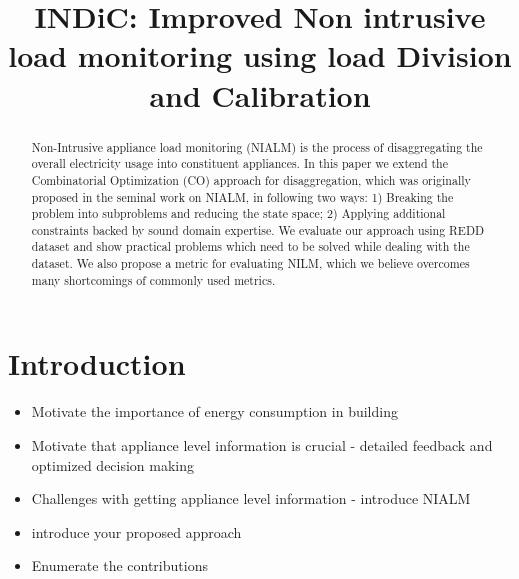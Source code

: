 \documentclass[conference]{IEEEtran}
\begin{document}
%
\title{INDiC: Improved Non intrusive load monitoring using load Division and Calibration}


\author{
\and
{}
\and
{}
}
\maketitle


\begin{abstract}
Non-Intrusive appliance load monitoring (NIALM) is the process of disaggregating the overall electricity usage into constituent appliances. In this paper we extend the Combinatorial Optimization (CO) approach for disaggregation, which was originally proposed in the seminal work on NIALM, in following two ways: 1) Breaking the problem into subproblems and reducing the state space; 2) Applying additional constraints backed by sound domain expertise. We evaluate our approach using REDD dataset and show practical problems which need to be solved while dealing with the dataset. We also propose a metric for evaluating NILM, which we believe overcomes many shortcomings of commonly used metrics.
\end{abstract}
\IEEEpeerreviewmaketitle



\section{Introduction}
\begin{itemize}
\item Motivate the importance of energy consumption in building
\item Motivate that appliance level information is crucial - detailed feedback and optimized decision making \cite{darby}
\item Challenges with getting appliance level information - introduce NIALM~\cite{hart}
\item introduce your proposed approach
\item Enumerate the contributions
\end{itemize}
\end{document}
